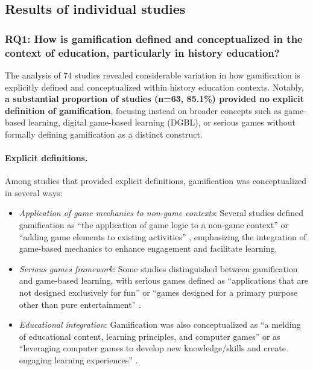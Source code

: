 \documentclass[a4paper,fleqn]{cas-sc}
\begin{document}
\subsection{Results of individual studies}
\subsubsection{RQ1: How is gamification defined and conceptualized in the context of education, particularly in history education?}

The analysis of 74 studies revealed considerable variation in how gamification is explicitly defined and conceptualized within history education contexts. Notably, \textbf{a substantial proportion of studies (n=63, 85.1\%) provided no explicit definition of gamification}, focusing instead on broader concepts such as game-based learning, digital game-based learning (DGBL), or serious games without formally defining gamification as a distinct construct.

\paragraph{Explicit definitions.}
Among studies that provided explicit definitions, gamification was conceptualized in several ways:

\begin{itemize}[noitemsep]
 \item \textit{Application of game mechanics to non-game contexts}: Several studies defined gamification as ``the application of game logic to a non-game context'' or ``adding game elements to existing activities'' \citep{43ali2018indonesian}, emphasizing the integration of game-based mechanics to enhance engagement and facilitate learning.
 
 \item \textit{Serious games framework}: Some studies distinguished between gamification and game-based learning, with serious games defined as ``applications that are not designed exclusively for fun'' \citep{52Lin2011265} or ``games designed for a primary purpose other than pure entertainment'' \citep{73Wolfartsberger2011160}.
 
 \item \textit{Educational integration}: Gamification was also conceptualized as ``a melding of educational content, learning principles, and computer games'' \citep{80gottlieb2018your} or as ``leveraging computer games to develop new knowledge/skills and create engaging learning experiences'' \citep{23Zin2009322}.
\end{itemize}
\end{document}
